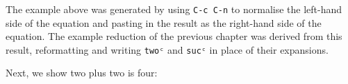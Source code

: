 \begin{fence}
\begin{code}
\AgdaSpace{}%
\AgdaSpace{}%
\AgdaSpace{}%
\AgdaSymbol{)}\AgdaSpace{}%
\AgdaSpace{}%
\AgdaSpace{}%
\<%
\\
%
\>[3]\AgdaSpace{}%
\AgdaSpace{}%
\AgdaSymbol{(}\AgdaSpace{}%
\AgdaSymbol{)}\AgdaSpace{}%
\<%
\\
\>[3][@{}l@{\AgdaIndent{0}}]%
\>[4]\AgdaSpace{}%
\AgdaSymbol{(}\AgdaSpace{}%
\AgdaSymbol{)}\<%
\\
%
\>[3]\AgdaSymbol{)}\<%
\\
%
\>[3]\AgdaSymbol{(}\AgdaSpace{}%
\AgdaSymbol{(}\AgdaSpace{}%
\AgdaSymbol{(}\AgdaSpace{}%
\AgdaSymbol{)))}\<%
\\
\>[0]\AgdaSymbol{\AgdaUnderscore{}}\AgdaSpace{}%
\AgdaSymbol{=}\AgdaSpace{}%
\<%
\end{code}
\end{fence}

The example above was generated by using \texttt{C-c\ C-n} to normalise
the left-hand side of the equation and pasting in the result as the
right-hand side of the equation. The example reduction of the previous
chapter was derived from this result, reformatting and writing
\texttt{twoᶜ} and \texttt{sucᶜ} in place of their expansions.

Next, we show two plus two is four:

